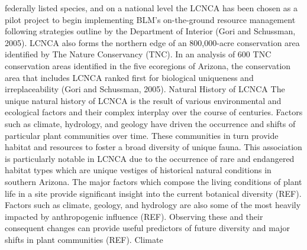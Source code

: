 \documentclass{article}
\begin{document}
federally listed species, and on a national level the LCNCA has been chosen as a pilot project to begin implementing BLM’s on-the-ground resource management following strategies outline by the Department of Interior (Gori and Schussman, 2005). LCNCA also forms the northern edge of an 800,000-acre conservation area identified by The Nature Conservancy (TNC). In an analysis of 600 TNC conservation areas identified in the five ecoregions of Arizona, the conservation area that includes LCNCA ranked first for biological uniqueness and irreplaceability (Gori and Schussman, 2005).
Natural History of LCNCA
The unique natural history of LCNCA is the result of various environmental and ecological factors and their complex interplay over the course of centuries. Factors such as climate, hydrology, and geology have driven the occurrence and shifts of particular plant communities over time. These communities in turn provide habitat and resources to foster a broad diversity of unique fauna. This association is particularly notable in LCNCA due to the occurrence of rare and endangered habitat types which are unique vestiges of historical natural conditions in southern Arizona. The major factors which compose the living conditions of plant life in a site provide significant insight into the current botanical diversity (REF). Factors such as climate, geology, and hydrology are also some of the most heavily impacted by anthropogenic influence (REF). Observing these and their consequent changes can provide useful predictors of future diversity and major shifts in plant communities (REF).
Climate
\end{document}
